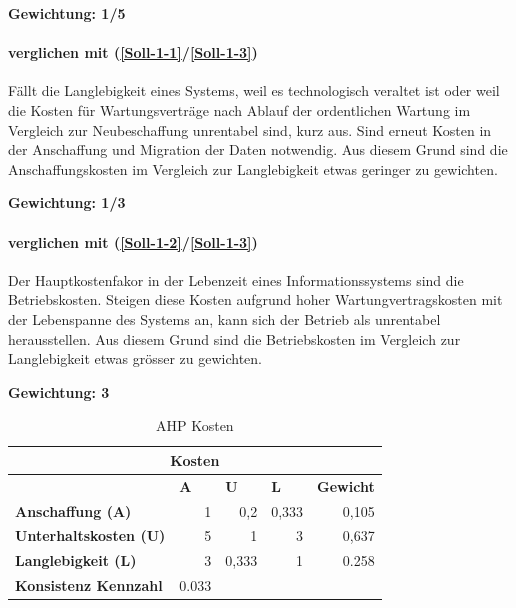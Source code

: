 \textbf{Gewichtung: 1/5}

\paragraph*{ verglichen mit  (\ref{Soll-1-1}/\ref{Soll-1-3})}
Fällt die Langlebigkeit eines Systems, weil es technologisch veraltet ist oder weil die Kosten für Wartungsverträge nach Ablauf der ordentlichen Wartung im Vergleich zur Neubeschaffung unrentabel sind, kurz aus. Sind erneut Kosten in der Anschaffung und Migration der Daten notwendig. Aus diesem Grund sind die Anschaffungskosten im Vergleich zur Langlebigkeit etwas geringer zu gewichten.

\textbf{Gewichtung: 1/3}


\paragraph*{ verglichen mit  (\ref{Soll-1-2}/\ref{Soll-1-3})}
Der Hauptkostenfakor in der Lebenzeit eines Informationssystems sind die Betriebskosten. Steigen diese Kosten aufgrund hoher Wartungvertragskosten mit der Lebenspanne des Systems an, kann sich der Betrieb als unrentabel herausstellen. Aus diesem Grund sind die Betriebskosten im Vergleich zur Langlebigkeit etwas grösser zu gewichten.

\textbf{Gewichtung: 3}

\begin{table}[htbp]
\caption{AHP Kosten}
\begin{tabular}{|l|r|l|l|l|}
\hline
\multicolumn{ 5}{|c|}{\textbf{Kosten}} \\ \hline
 & \multicolumn{1}{l|}{\textbf{A}} & \textbf{U} & \textbf{L} & \textbf{Gewicht} \\ \hline
\textbf{Anschaffung (A)} & 1 & \multicolumn{1}{r|}{0,2} & \multicolumn{1}{r|}{0,333} & \multicolumn{1}{r|}{0,105} \\ \hline
\textbf{Unterhaltskosten (U)} & 5 & \multicolumn{1}{r|}{1} & \multicolumn{1}{r|}{3} & \multicolumn{1}{r|}{0,637} \\ \hline
\textbf{Langlebigkeit (L)} & 3 & \multicolumn{1}{r|}{0,333} & \multicolumn{1}{r|}{1} & \multicolumn{1}{r|}{0.258} \\ \hline
\textbf{Konsistenz Kennzahl} & 0.033 \\ \cline{1-2}
\end{tabular}
\label{tab:AHPKosten}
\end{table}

